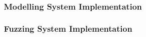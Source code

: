 \subsubsection{Modelling System Implementation}\label{planning_modelling_implementation}



\subsubsection{Fuzzing System Implementation}


